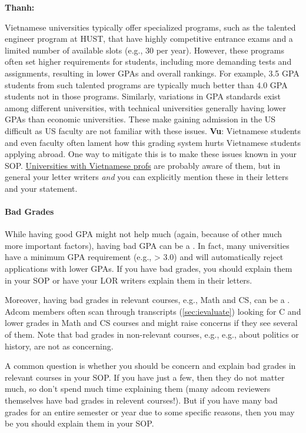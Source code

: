 \documentclass[oneside,11pt,dvipsnames]{book}
\newenvironment{commentbox}[1][]{
  \small
  \begin{mybox}
    {\small \textbf{#1}}
  }{
  \end{mybox}
}
\newcommand{\red}[1]{{\color{red}{#1}}}
\begin{document}
\begin{commentbox}[Thanh:]
    Vietnamese universities typically offer specialized programs, such as the talented engineer program at HUST, that have highly competitive entrance exams and a limited number of available slots (e.g., 30 per year). However, these programs often set higher requirements for students, including more demanding tests and assignments, resulting in lower GPAs and overall rankings. For example, 3.5 GPA students from such talented programs are typically much better than 4.0 GPA students not in those programs.  Similarly, variations in GPA standards exist among different universities, with technical universities generally having lower GPAs than economic universities. These make gaining admission in the US difficult as US faculty are not familiar with these issues.
    \tcblower
    \textbf{Vu}: Vietnamese students and even faculty often lament how this grading system hurts Vietnamese students applying abroad. One way to mitigate this is to make these issues known in your SOP.  \href{https://github.com/dynaroars/dynaroars.github.io/wiki/Viet-CS-Profs-US}{Universities with Vietnamese profs} are probably aware of them, but in general your letter writers \emph{and} you can explicitly mention these in their letters and your statement.
  \end{commentbox}

  
\paragraph{Bad Grades} 
While having good GPA might not help much (again, because of other much more important factors),
having bad GPA can be a \red{red flag}. In fact, many universities have a minimum GPA requirement (e.g., > 3.0) and will automatically reject applications with lower GPAs.  
If you have bad grades, you should explain them in your SOP or have your LOR writers explain them in their letters.

Moreover, having bad grades in relevant courses, e.g., Math and CS, can be a \red{red flag}.
Adcom members often scan through transcripts (\autoref{sec:ievaluate}) looking for C and lower grades in Math and CS courses and might raise concerns if they see several of them.
Note that bad grades in non-relevant courses, e.g., e.g., about politics or history, are not as concerning.

A common question is whether you should be concern and explain bad grades in relevant courses in your SOP.  If you have just a few, then they do not matter much, so don't spend much time explaining them (many adcom reviewers themselves have bad grades in relevent courses!). But if you have many bad grades for an entire semester or year due to some specific reasons, then you may be you should explain them in your SOP.
\end{document}
